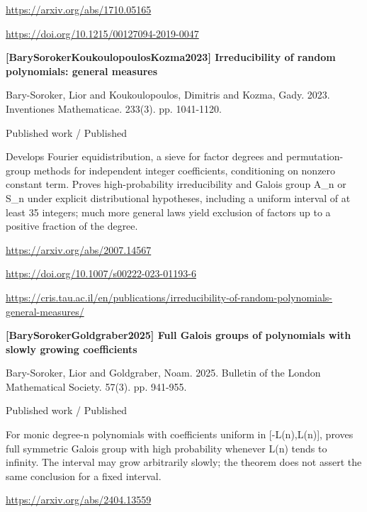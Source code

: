 \documentclass[11pt,a4paper,oneside,openany]{book}
\begin{document}
{\footnotesize\url{https://arxiv.org/abs/1710.05165}}\par
{\footnotesize\url{https://doi.org/10.1215/00127094-2019-0047}}\par
\vspace{9pt}
\hypertarget{ref:BarySorokerKoukoulopoulosKozma2023}{}
{\sffamily\bfseries\color{atlasgreen}[BarySorokerKoukoulopoulosKozma2023] Irreducibility of random polynomials: general measures}\par
\color{black} Bary-Soroker, Lior and Koukoulopoulos, Dimitris and Kozma, Gady. 2023. Inventiones Mathematicae. 233(3). pp. 1041-1120.\par
{\small\sffamily\color{atlasgold}Published work / Published}\par
\color{black} Develops Fourier equidistribution, a sieve for factor degrees and permutation-group methods for independent integer coefficients, conditioning on nonzero constant term. Proves high-probability irreducibility and Galois group A\_\allowbreak{}n or S\_\allowbreak{}n under explicit distributional hypotheses, including a uniform interval of at least 35 integers; much more general laws yield exclusion of factors up to a positive fraction of the degree.\par
{\footnotesize\url{https://arxiv.org/abs/2007.14567}}\par
{\footnotesize\url{https://doi.org/10.1007/s00222-023-01193-6}}\par
{\footnotesize\url{https://cris.tau.ac.il/en/publications/irreducibility-of-random-polynomials-general-measures/}}\par
\vspace{9pt}
\hypertarget{ref:BarySorokerGoldgraber2025}{}
{\sffamily\bfseries\color{atlasgreen}[BarySorokerGoldgraber2025] Full Galois groups of polynomials with slowly growing coefficients}\par
\color{black} Bary-Soroker, Lior and Goldgraber, Noam. 2025. Bulletin of the London Mathematical Society. 57(3). pp. 941-955.\par
{\small\sffamily\color{atlasgold}Published work / Published}\par
\color{black} For monic degree-n polynomials with coefficients uniform in [-L(n),L(n)], proves full symmetric Galois group with high probability whenever L(n) tends to infinity. The interval may grow arbitrarily slowly; the theorem does not assert the same conclusion for a fixed interval.\par
{\footnotesize\url{https://arxiv.org/abs/2404.13559}}\par
\end{document}
